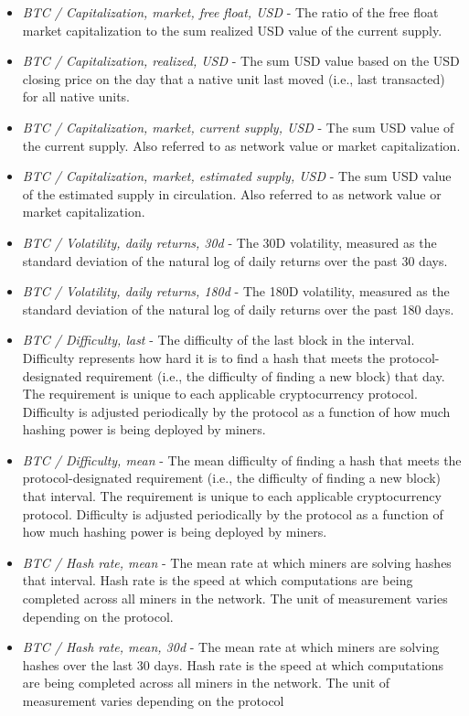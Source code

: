 \begin{itemize}
    \item \textit{BTC / Capitalization, market, free float, USD} - The ratio of the free float market capitalization to the sum realized USD value of the current supply.
    \item \textit{BTC / Capitalization, realized, USD} - The sum USD value based on the USD closing price on the day that a native unit last moved (i.e., last transacted) for all native units.
    \item \textit{BTC / Capitalization, market, current supply, USD} - The sum USD value of the current supply. Also referred to as network value or market capitalization.
    \item \textit{BTC / Capitalization, market, estimated supply, USD} - The sum USD value of the estimated supply in circulation. Also referred to as network value or market capitalization.
    \item \textit{BTC / Volatility, daily returns, 30d} - The 30D volatility, measured as the standard deviation of the natural log of daily returns over the past 30 days.
    \item \textit{BTC / Volatility, daily returns, 180d} - The 180D volatility, measured as the standard deviation of the natural log of daily returns over the past 180 days.
    \item \textit{BTC / Difficulty, last} - The difficulty of the last block in the interval. Difficulty represents how hard it is to find a hash that meets the protocol-designated requirement (i.e., the difficulty of finding a new block) that day. The requirement is unique to each applicable cryptocurrency protocol. Difficulty is adjusted periodically by the protocol as a function of how much hashing power is being deployed by miners.
    \item \textit{BTC / Difficulty, mean} - The mean difficulty of finding a hash that meets the protocol-designated requirement (i.e., the difficulty of finding a new block) that interval. The requirement is unique to each applicable cryptocurrency protocol. Difficulty is adjusted periodically by the protocol as a function of how much hashing power is being deployed by miners.
    \item \textit{BTC / Hash rate, mean} - The mean rate at which miners are solving hashes that interval. Hash rate is the speed at which computations are being completed across all miners in the network. The unit of measurement varies depending on the protocol.
    \item \textit{BTC / Hash rate, mean, 30d} - The mean rate at which miners are solving hashes over the last 30 days. Hash rate is the speed at which computations are being completed across all miners in the network. The unit of measurement varies depending on the protocol

\end{itemize}
